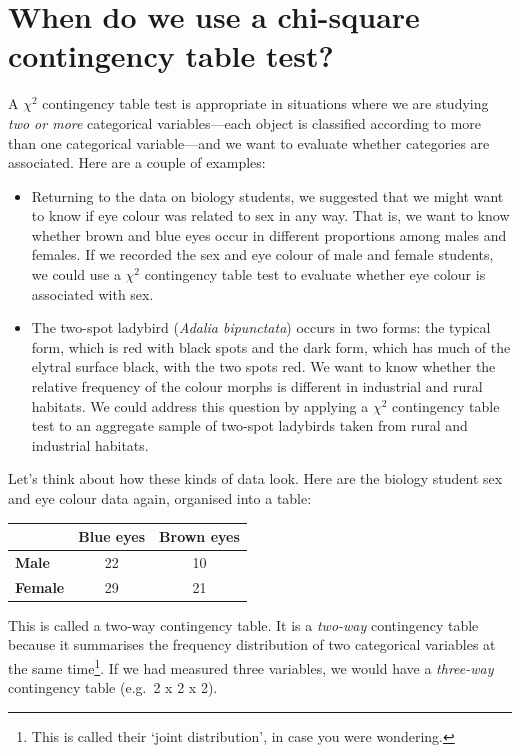 \documentclass[
]{book}
\begin{document}
\hypertarget{when-do-we-use-a-chi-square-contingency-table-test}{%
\section{When do we use a chi-square contingency table test?}\label{when-do-we-use-a-chi-square-contingency-table-test}}

A \(\chi^{2}\) contingency table test is appropriate in situations where we are studying \emph{two or more} categorical variables---each object is classified according to more than one categorical variable---and we want to evaluate whether categories are associated. Here are a couple of examples:

\begin{itemize}
\item
  Returning to the data on biology students, we suggested that we might want to know if eye colour was related to sex in any way. That is, we want to know whether brown and blue eyes occur in different proportions among males and females. If we recorded the sex and eye colour of male and female students, we could use a \(\chi^{2}\) contingency table test to evaluate whether eye colour is associated with sex.
\item
  The two-spot ladybird (\emph{Adalia bipunctata}) occurs in two forms: the typical form, which is red with black spots and the dark form, which has much of the elytral surface black, with the two spots red. We want to know whether the relative frequency of the colour morphs is different in industrial and rural habitats. We could address this question by applying a \(\chi^{2}\) contingency table test to an aggregate sample of two-spot ladybirds taken from rural and industrial habitats.
\end{itemize}

Let's think about how these kinds of data look. Here are the biology student sex and eye colour data again, organised into a table:

\begin{longtable}[]{@{}lcc@{}}
\toprule()
& Blue eyes & Brown eyes \\
\midrule()
\endhead
\textbf{Male} & 22 & 10 \\
\textbf{Female} & 29 & 21 \\
\bottomrule()
\end{longtable}

This is called a two-way contingency table. It is a \emph{two-way} contingency table because it summarises the frequency distribution of two categorical variables at the same time\footnote{This is called their `joint distribution', in case you were wondering.}. If we had measured three variables, we would have a \emph{three-way} contingency table (e.g.~2 x 2 x 2).
\end{document}
